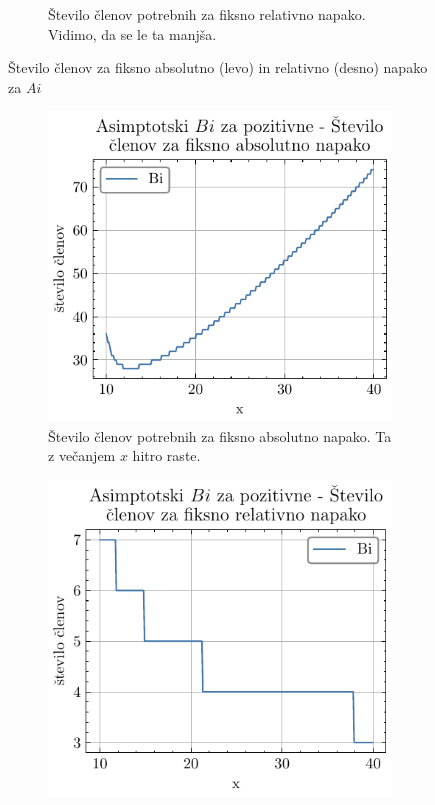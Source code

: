 \documentclass[slovene,11pt,a4paper]{article}
\begin{document}
\begin{figure}[ht]
\begin{subfigure}{0.48\textwidth}
    \caption{Število členov potrebnih za fiksno relativno napako. Vidimo, da se le ta manjša.}
    \label{fig:d}
  \end{subfigure}
  \caption{Število členov za fiksno absolutno (levo) in relativno (desno) napako za $Ai$}
\end{figure}

\begin{figure}[ht]
  \begin{subfigure}{0.48\textwidth}
    \centering
    \includegraphics[width=\linewidth]{graphs/pos_abs_err_n_bi.pdf}
    \caption{Število členov potrebnih za fiksno absolutno napako. Ta z večanjem $x$ hitro raste.}
  \end{subfigure}\hfill
  \begin{subfigure}{0.48\textwidth}
    \centering
    \includegraphics[width=\linewidth]{graphs/pos_rel_err_n_Bi.pdf}

\end{subfigure}
\end{figure}
\end{document}
